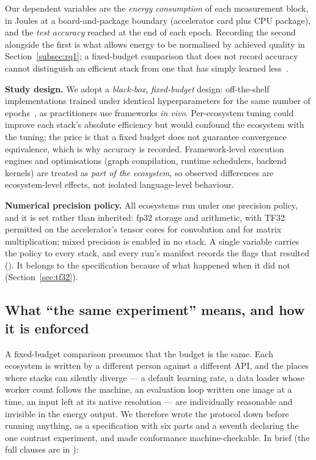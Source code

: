 Our dependent variables are the \emph{energy consumption} of each measurement
block, in Joules at a board-and-package boundary (accelerator card plus CPU package), and
the \emph{test accuracy} reached at the end of each epoch. Recording the second
alongside the first is what allows energy to be normalised by achieved quality
in Section~\ref{subsec:rq1}; a fixed-budget comparison that does not record
accuracy cannot distinguish an efficient stack from one that has simply learned
less~\citep{patterson2021carbon,dodge2022efficient,luccioni2023counting}.

\textbf{Study design.}
We adopt a \emph{black-box}, \emph{fixed-budget} design: off-the-shelf
implementations trained under identical hyperparameters for the same number of
epochs~\citep{pereira2017energy,georgiou2017analyzing,rua2024large}, as
practitioners use frameworks \emph{in vivo}. Per-ecosystem tuning could improve
each stack's absolute efficiency but would confound the ecosystem with the
tuning; the price is that a fixed budget does not guarantee convergence
equivalence, which is why accuracy is recorded. Framework-level execution
engines and optimisations (graph compilation, runtime schedulers, backend
kernels) are treated as \emph{part of the ecosystem}, so observed differences
are ecosystem-level effects, not isolated language-level behaviour.

\textbf{Numerical precision policy.}
All \vEcosystems{} ecosystems run under one precision policy, and it is set
rather than inherited: fp32 storage and arithmetic, with TF32 permitted on the
accelerator's tensor cores for convolution and for matrix multiplication; mixed
precision is enabled in no stack. A single variable carries the policy to every
stack, and every run's manifest records the flags that resulted
(). It belongs to the specification because of
what happened when it did not (Section~\ref{sec:tf32}).

\subsection{What ``the same experiment'' means, and how it is enforced}
\label{subsec:spec}

A fixed-budget comparison presumes that the budget is the same. Each ecosystem
is written by a different person against a different API, and the places where
stacks can silently diverge --- a default learning rate, a data loader whose
worker count follows the machine, an evaluation loop written one image at a
time, an input left at its native resolution --- are individually reasonable and
invisible in the energy output. We therefore wrote the protocol down before
running anything, as a specification with six parts and a seventh declaring the
one contrast experiment, and made conformance machine-checkable. In brief (the
full clauses are in ):

